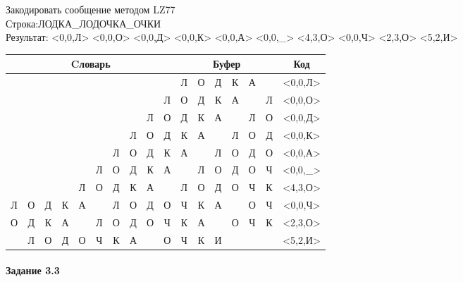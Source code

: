 \documentclass[a4paper, 12pt]{article}
\begin{document}
Закодировать сообщение методом LZ77\\
Строка:ЛОДКА\_ЛОДОЧКА\_ОЧКИ\\
Результат: <0,0,Л> <0,0,О> <0,0,Д> <0,0,К> <0,0,А> <0,0,\_> <4,3,О> <0,0,Ч> <2,3,О> <5,2,И>\\
\begin{table}[h!]
\centering
\begin{tabular}{|c|c|c|c|c|c|c|c|c|c|c|c|c|c|c|c|c|} 
\hline
\multicolumn{10}{|c|}{Cловарь} & \multicolumn{6}{c|}{Буфер} & Код  \\ \hline
  &   &   &   &   &   &   &   &   &   & \cellcolor[HTML]{8CE4F6} Л & О & Д & К & А &   & <0,0,Л>
\\ \hline
  &   &   &   &   &   &   &   &   & Л & \cellcolor[HTML]{8CE4F6} О & Д & К & А &   & Л & <0,0,О>
\\ \hline
  &   &   &   &   &   &   &   & Л & О & \cellcolor[HTML]{8CE4F6} Д & К & А &   & Л & О & <0,0,Д>
\\ \hline
  &   &   &   &   &   &   & Л & О & Д & \cellcolor[HTML]{8CE4F6} К & А &   & Л & О & Д & <0,0,К>
\\ \hline
  &   &   &   &   &   & Л & О & Д & К & \cellcolor[HTML]{8CE4F6} А &   & Л & О & Д & О & <0,0,А>
\\ \hline
  &   &   &   &   & Л & О & Д & К & А & \cellcolor[HTML]{8CE4F6}   & Л & О & Д & О & Ч & <0,0,\_>
\\ \hline
  &   &   &   & \cellcolor[HTML]{FFFF00} Л & \cellcolor[HTML]{FFFF00} О & \cellcolor[HTML]{FFFF00} Д & К & А &   & \cellcolor[HTML]{FFFF00} Л & \cellcolor[HTML]{FFFF00} О & \cellcolor[HTML]{FFFF00} Д & \cellcolor[HTML]{8CE4F6} О & Ч & К & <4,3,О>
\\ \hline
Л & О & Д & К & А &   & Л & О & Д & О & \cellcolor[HTML]{8CE4F6} Ч & К & А &   & О & Ч & <0,0,Ч>
\\ \hline
О & Д & \cellcolor[HTML]{FFFF00} К & \cellcolor[HTML]{FFFF00} А & \cellcolor[HTML]{FFFF00}   & Л & О & Д & О & Ч & \cellcolor[HTML]{FFFF00} К & \cellcolor[HTML]{FFFF00} А & \cellcolor[HTML]{FFFF00}   & \cellcolor[HTML]{8CE4F6} О & Ч & К & <2,3,О>
\\ \hline
  & Л & О & Д & О & \cellcolor[HTML]{FFFF00} Ч & \cellcolor[HTML]{FFFF00} К & А &   & О & \cellcolor[HTML]{FFFF00} Ч & \cellcolor[HTML]{FFFF00} К & \cellcolor[HTML]{8CE4F6} И &   &   &   & <5,2,И>
\\ \hline
\end{tabular}
\end{table}

\paragraph{Задание 3.3}
\end{document}
